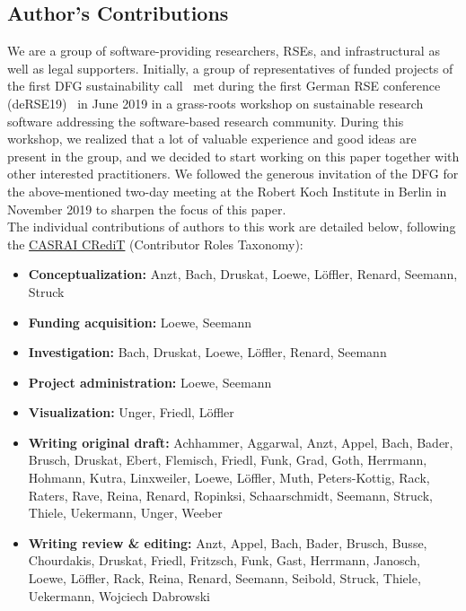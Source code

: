\documentclass[a4paper,num-refs,numbers,sort&compress]{de-rse}
\begin{document}


\subsection{Author's Contributions}
We are a group of software-providing researchers, RSEs, and infrastructural as well as legal supporters. Initially, a group of representatives of funded projects of the first DFG sustainability call~\cite{DFGfunded} met during the first German RSE conference (deRSE19)~\cite{deRSEconf} in June 2019 in a grass-roots workshop on sustainable research software addressing the software-based research community. During this workshop, we realized that a lot of valuable experience and good ideas are present in the group, and we decided to start working on this paper together with other interested practitioners. We followed the generous invitation of the DFG for the above-mentioned two-day meeting at the Robert Koch Institute in Berlin in November 2019 to sharpen the focus of this paper.\\
The individual contributions of authors to this work are detailed below, following the \href{https://casrai.org/credit/}{CASRAI CRediT} (Contributor Roles Taxonomy):
\begin{itemize}
    \item \textbf{Conceptualization:}  Anzt, Bach, Druskat, Loewe, Löffler,
    Renard, Seemann, Struck
    \item \textbf{Funding acquisition:} Loewe, Seemann
    \item \textbf{Investigation:} Bach, Druskat, Loewe, Löffler, Renard,
    Seemann
    \item \textbf{Project administration:} Loewe, Seemann
    \item \textbf{Visualization:} Unger, Friedl, Löffler
    \item \textbf{Writing original draft:} Achhammer, Aggarwal, Anzt, Appel, Bach, Bader, Brusch, Druskat, Ebert, Flemisch, Friedl, Funk, Grad, Goth, Herrmann, Hohmann, Kutra, Linxweiler, Loewe,
    Löffler, Muth, Peters-Kottig, Rack, Raters, Rave, Reina, Renard, Ropinksi, Schaarschmidt, Seemann, Struck, Thiele, Uekermann, Unger, Weeber
    \item \textbf{Writing review \& editing:} Anzt, Appel, Bach, Bader, Brusch, 
    Busse, Chourdakis, Druskat, Friedl, Fritzsch, Funk, Gast, Herrmann, Janosch, Loewe, Löffler, Rack, Reina,
    Renard, Seemann, Seibold, Struck, Thiele, Uekermann, Wojciech Dabrowski
\end{itemize}
\end{document}

